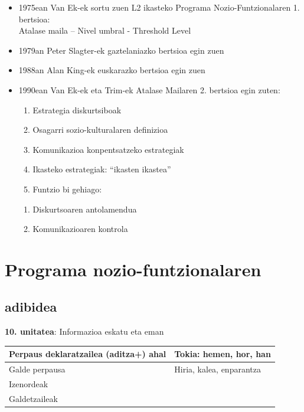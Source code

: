 \documentclass[
]{book}
\providecommand{\tightlist}{%
  \setlength{\itemsep}{0pt}\setlength{\parskip}{0pt}}
\begin{document}
\begin{itemize}
\tightlist
\item
  1975ean Van Ek-ek sortu zuen L2 ikasteko Programa Nozio-Funtzionalaren 1. bertsioa:\\
  Atalase maila -- Nivel umbral - Threshold Level
\item
  1979an Peter Slagter-ek gaztelaniazko bertsioa egin zuen
\item
  1988an Alan King-ek euskarazko bertsioa egin zuen
\item
  1990ean Van Ek-ek eta Trim-ek Atalase Mailaren 2. bertsioa egin zuten:

  \begin{enumerate}
  \def\labelenumi{\arabic{enumi}.}
  \tightlist
  \item
    Estrategia diskurtsiboak
  \item
    Osagarri sozio-kulturalaren definizioa
  \item
    Komunikazioa konpentsatzeko estrategiak
  \item
    Ikasteko estrategiak: ``ikasten ikastea''
  \item
    Funtzio bi gehiago:
  \end{enumerate}

  \begin{enumerate}
  \def\labelenumi{\alph{enumi}.}
  \tightlist
  \item
    Diskurtsoaren antolamendua
  \item
    Komunikazioaren kontrola
  \end{enumerate}
\end{itemize}

\hypertarget{programa-nozio-funtzionalaren}{%
\section{Programa nozio-funtzionalaren}\label{programa-nozio-funtzionalaren}}

\hypertarget{adibidea}{%
\subsection{adibidea}\label{adibidea}}

\textbf{10. unitatea}: Informazioa eskatu eta eman

\begin{longtable}[]{@{}ll@{}}
\toprule
Perpaus deklaratzailea (aditza+) ahal & Tokia: hemen, hor, han \\
\midrule
\endhead
Galde perpausa & Hiria, kalea, enparantza \\
Izenordeak & \\
Galdetzaileak & \\
\bottomrule
\end{longtable}
\end{document}
